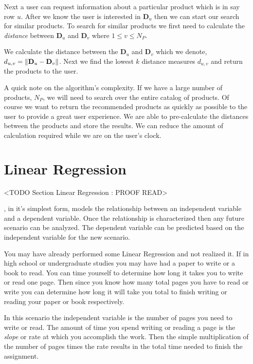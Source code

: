 Next a user can request information about a particular product which is in say row $u$. After we know the user is interested in $\mathbf{D}_u$ then we can start our search for similar products. To search for similar products we first need to calculate the \emph{distance} between $\mathbf{D}_u$ and $\mathbf{D}_v$ where $1 \leq v \leq N_P$. 

We calculate the distance between the $\mathbf{D}_u$ and $\mathbf{D}_v$ which we denote, $d_{u,v} = \| \mathbf{D}_u-\mathbf{D}_v \|$. Next we find the lowest $k$ distance measures $d_{u,v}$ and return the products to the user. 

A quick note on the algorithm's complexity. If we have a large number of products, $N_P$, we will need to search over the entire catalog of products. Of course we want to return the recommended products as quickly as possible to the user to provide a great user experience. We are able to pre-calculate the distances between the products and store the results. We can reduce the amount of calculation required while we are on the user's clock. 
	
\section{Linear Regression}
	<TODO Section Linear Regression : PROOF READ>
	
, in it's simplest form, models the relationship between an independent variable and a dependent variable. Once the relationship is characterized then any future scenario can be analyzed. The dependent variable can be predicted based on the independent variable for the new scenario. 

You may have already performed some Linear Regression and not realized it. If in high school or undergraduate studies you may have had a paper to write or a book to read. You can time yourself to determine how long it takes you to write or read one page. Then since you know how many total pages you have to read or write you can determine how long it will take you total to finish writing or reading your paper or book respectively. 

In this scenario the independent variable is the number of pages you need to write or read. The amount of time you spend writing or reading a page is the \emph{slope} or rate at which you accomplish the work. Then the simple multiplication of the number of pages times the rate results in the total time needed to finish the assignment. 

